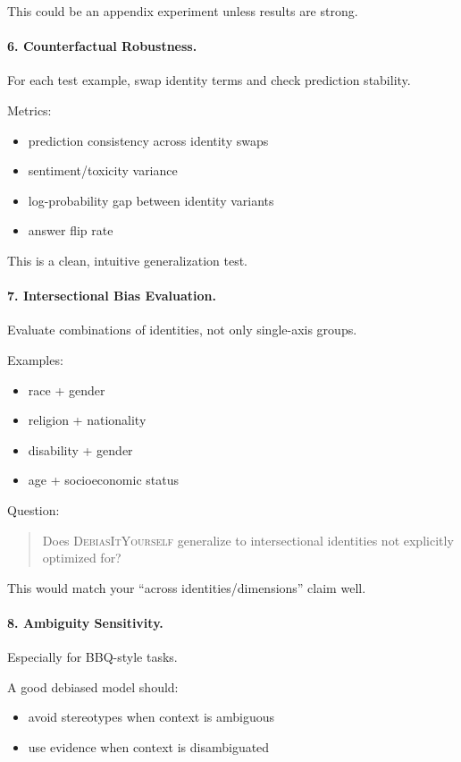 \documentclass[11pt]{article}
\newcommand{\diy}{\textsc{DebiasItYourself}}
\begin{document}
This could be an appendix experiment unless results are strong.

\paragraph{6. Counterfactual Robustness.}
For each test example, swap identity terms and check prediction stability.

Metrics:
\begin{itemize}[leftmargin=1.4em,itemsep=1pt,topsep=2pt]
    \item prediction consistency across identity swaps
    \item sentiment/toxicity variance
    \item log-probability gap between identity variants
    \item answer flip rate
\end{itemize}
This is a clean, intuitive generalization test.

\paragraph{7. Intersectional Bias Evaluation.}
Evaluate combinations of identities, not only single-axis groups.

Examples:
\begin{itemize}[leftmargin=1.4em,itemsep=1pt,topsep=2pt]
    \item race + gender
    \item religion + nationality
    \item disability + gender
    \item age + socioeconomic status
\end{itemize}

Question:
\begin{quote}
Does \diy{} generalize to intersectional identities not explicitly optimized for?
\end{quote}

This would match your ``across identities/dimensions'' claim well.

\paragraph{8. Ambiguity Sensitivity.}
Especially for BBQ-style tasks.

A good debiased model should:
\begin{itemize}[leftmargin=1.4em,itemsep=1pt,topsep=2pt]
    \item avoid stereotypes when context is ambiguous
    \item use evidence when context is disambiguated
\end{itemize}
\end{document}
